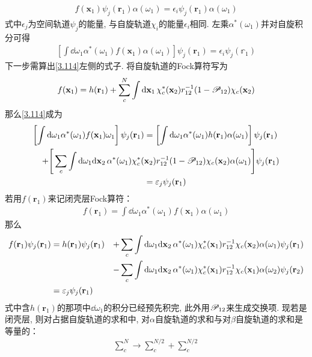\begin{align}\label{3.113}
	f(\mathbf{x}_1)\psi_j(\mathbf{r}_1)\alpha(\omega_1) = \epsilon_i\psi_j(\mathbf{r}_1)\alpha(\omega_1)
\end{align}
式中$\epsilon_j$为空间轨道$\psi_j$的能量, 
与自旋轨道$\chi_i$的能量$\epsilon_i$相同. 
左乘$\alpha^*(\omega_1)$并对自旋积分可得
\begin{align}
	\label{3.114}
	\left[ \int\dd\omega_1\alpha^*(\omega_1)f(\mathbf{x}_1)\alpha(\omega_1) \right]\psi_j(\mathbf{r}_1) = \epsilon_i\psi_j(\mathbb{r}_1)
\end{align}
下一步需算出\autoref{3.114}左侧的式子. 
将自旋轨道的Fock算符写为
\begin{align}\label{3.115}
	f(\mathbf{x}_1) = h(\mathbf{r}_1) + \sum_c^N\int\dd{x}_1\,\chi_c^*(\mathbf{x}_2)\twoe(1-\scr{P}_{12})\chi_c(\mathbf{x}_2)
\end{align}
那么\autoref{3.114}成为
\begin{align}
	\left[ \int\dd\omega_1\alpha^*(\omega_1)f(\mathbf{x}_1)\omega_1 \right]\psi_j(\mathbf{r}_1) &= \left[ \int\dd\omega_1\alpha^*(\omega_1)h(\mathbf{r}_1)\alpha(\omega_1) \right]\psi_j(\mathbf{r}_1) \notag\\
	+\Bigg[ \sum_c\int\dd\omega_1\dd{x}_2\,\alpha^*(\omega_1)\chi_c^*(&\mathbf{x}_2)\twoe(1-\scr{P}_{12})\chi_c(\mathbf{x}_2)\alpha(\omega_1) \Bigg]\psi_j(\mathbf{r}_1)  \notag\\
	& = \epsilon_j\psi_j(\mathbf{r}_1)
\end{align}
若用$f(\mathbf{r}_1)$来记闭壳层Fock算符：
\begin{align}
	f(\mathbf{r}_1) = \int\dd\omega_1\alpha^*(\omega_1)f(\mathbf{x}_1)\alpha(\omega_1)
\end{align}
那么
\begin{alignat}{3}
	f(\mathbf{r}_1)\psi_j(\mathbf{r}_1) &= h(\mathbf{r}_1)\psi_j(\mathbf{r}_1) &+ \sum_c\int\dd\omega_1\dd{x}_2\,\alpha^*(\omega_1)\chi_c^*(\mathbf{x}_1)\twoe\chi_c(\mathbf{x}_2)\alpha(\omega_1)\psi_j(\mathbf{r}_1)\notag\\
	&&-\sum_c\int\dd\omega_1\dd{x}_2\,\alpha^*(\omega_1)\chi_c^*(\mathbf{x}_1)\twoe\chi_c(\mathbf{x}_1)\alpha(\omega_2)\psi_j(\mathbf{r}_2)\notag\\
	&=\epsilon_j\psi_j(\mathbf{r}_1)&
\end{alignat}
式中含$h(\mathbf{r}_1)$的那项中$\dd\omega_1$的积分已经预先积完, 
此外用$\mathscr{P}_{12}$来生成交换项. 
现若是闭壳层, 
则对占据自旋轨道的求和中, 
对$\alpha$自旋轨道的求和与对$\beta$自旋轨道的求和是等量的：
\begin{align}
	\sum_c^N\to \sum_c^{N/2} + \sum_c^{N/2}
\end{align}
